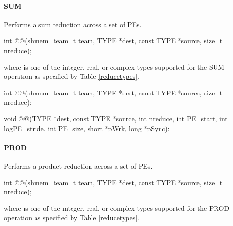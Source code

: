 \begin{apidefinition}
\paragraph{SUM}
Performs a sum reduction across a set of \acp{PE}.\newline

{\color{Green}
\begin{C11synopsis}
int @@(shmem_team_t team, TYPE *dest, const TYPE *source, size_t nreduce);
\end{C11synopsis}
where \TYPE{} is one of the integer, real, or complex types supported for the SUM operation as specified by Table \ref{reducetypes}.
}

\begin{Csynopsis}
\end{Csynopsis}

{\color{Green}
\begin{CsynopsisCol}
int @@(shmem_team_t team, TYPE *dest, const TYPE *source, size_t nreduce);
\end{CsynopsisCol}
}
\begin{DeprecateBlock}
\begin{CsynopsisCol}
void @@(TYPE *dest, const TYPE *source, int nreduce, int PE_start, int logPE_stride, int PE_size, short *pWrk, long *pSync);
\end{CsynopsisCol}
\end{DeprecateBlock}

\paragraph{PROD}
Performs a product reduction across a set of \acp{PE}.\newline

{\color{Green}
\begin{C11synopsis}
int @@(shmem_team_t team, TYPE *dest, const TYPE *source, size_t nreduce);
\end{C11synopsis}
where \TYPE{} is one of the integer, real, or complex types supported for the PROD operation as specified by Table \ref{reducetypes}.
}

\begin{Csynopsis}
\end{Csynopsis}


\end{apidefinition}
